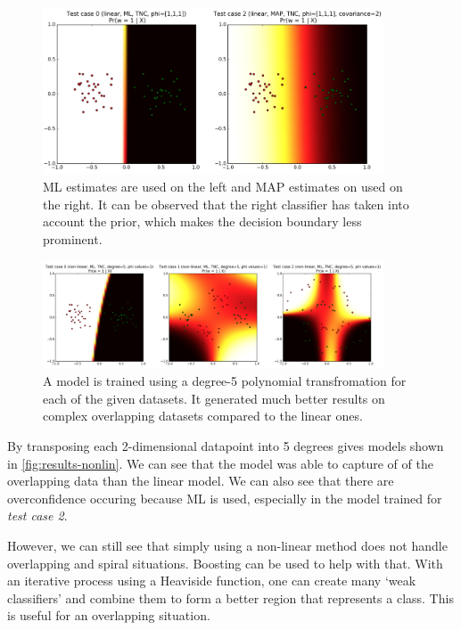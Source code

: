 \documentclass[11pt,openright,a4paper]{article}
\numberwithin{equation}{section}
\begin{document}
\begin{figure}[H]
  \centering
  \includegraphics[width=0.9\textwidth]{ml-map-comp}
    \caption{ML estimates are used on the left and MAP estimates on used on the right. It can be observed that the right classifier has taken into account the prior, which makes the decision boundary less prominent.}
  \label{fig:ml-map-comp}
\end{figure}

\begin{figure}[H]
  \centering
  \includegraphics[width=0.9\textwidth]{results-nonlin}
    \caption{A model is trained using a degree-5 polynomial transfromation for each of the given datasets. It generated much better results on complex overlapping datasets compared to the linear ones.}
  \label{fig:results-nonlin}
\end{figure}

By transposing each 2-dimensional datapoint into 5 degrees gives models shown in \autoref{fig:results-nonlin}. We can see that the model was able to capture of of the overlapping data than the linear model. We can also see that there are overconfidence occuring because ML is used, especially in the model trained for \textit{test case 2}.

However, we can still see that simply using a non-linear method does not handle overlapping and spiral situations. Boosting can be used to help with that. With an iterative process using a Heaviside function, one can create many `weak classifiers' and combine them to form a better region that represents a class. This is useful for an overlapping situation.




\end{document}
